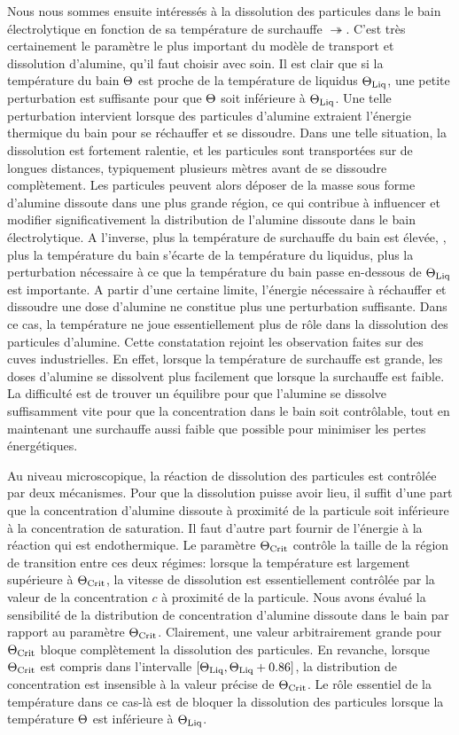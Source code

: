 Nous nous sommes ensuite intéressés à la dissolution des particules
dans le bain électrolytique en fonction de sa température de
surchauffe $\tsur$. C'est très certainement le paramètre le plus
important du modèle de transport et dissolution d'alumine, qu'il faut
choisir avec soin. Il est clair que si la température du bain
$\Theta$ est proche de la température de liquidus $\Theta_\text{Liq}$, une
petite perturbation est suffisante pour que $\Theta$ soit inférieure
à $\Theta_\text{Liq}$. Une telle perturbation intervient lorsque des particules
d'alumine extraient l'énergie thermique du bain pour se réchauffer et
se dissoudre. Dans une telle situation, la dissolution est fortement
ralentie, et les particules sont transportées sur de longues distances,
typiquement plusieurs mètres avant de se dissoudre complètement. Les
particules peuvent alors déposer de la masse sous forme d'alumine
dissoute dans une plus grande région, ce qui contribue à influencer et
modifier significativement la distribution de l'alumine dissoute dans
le bain électrolytique. A l'inverse, plus la température de surchauffe
du bain est élevée, \ie, plus la température du bain s'écarte de la
température du liquidus, plus la perturbation nécessaire à ce que la
température du bain passe en-dessous de $\Theta_\text{Liq}$ est importante. A
partir d'une certaine limite, l'énergie nécessaire à réchauffer et
dissoudre une dose d'alumine ne constitue plus une perturbation
suffisante. Dans ce cas, la température ne joue essentiellement plus
de rôle dans la dissolution des particules d'alumine. Cette
constatation rejoint les observation faites sur des cuves
industrielles. En effet, lorsque la température de surchauffe est
grande, les doses d'alumine se dissolvent plus facilement que lorsque
la surchauffe est faible. La difficulté est de trouver un équilibre
pour que l'alumine se dissolve suffisamment vite pour que la
concentration dans le bain soit contrôlable, tout en maintenant une
surchauffe aussi faible que possible pour minimiser les pertes
énergétiques.

Au niveau microscopique, la réaction de dissolution des particules est
contrôlée par deux mécanismes. Pour que la dissolution puisse avoir
lieu, il suffit d'une part que la concentration d'alumine dissoute à
proximité de la particule soit inférieure à la concentration de
saturation. Il faut d'autre part fournir de l'énergie à la réaction
qui est endothermique. Le paramètre $\Theta_\text{Crit}$ contrôle la taille de la
région de transition entre ces deux régimes: lorsque la température
est largement supérieure à $\Theta_\text{Crit}$, la vitesse de dissolution est
essentiellement contrôlée par la valeur de la concentration $c$ à
proximité de la particule. Nous avons évalué la sensibilité de la
distribution de concentration d'alumine dissoute dans le bain par
rapport au paramètre $\Theta_\text{Crit}$. Clairement, une valeur arbitrairement
grande pour $\Theta_\text{Crit}$ bloque complètement la dissolution des
particules. En revanche, lorsque $\Theta_\text{Crit}$ est compris dans
l'intervalle $[\Theta_\text{Liq}, \Theta_\text{Liq} + 0.86]$, la distribution de concentration
est insensible à la valeur précise de $\Theta_\text{Crit}$. Le rôle essentiel de
la température dans ce cas-là est de bloquer la dissolution des
particules lorsque la température $\Theta$ est inférieure à
$\Theta_\text{Liq}$.

